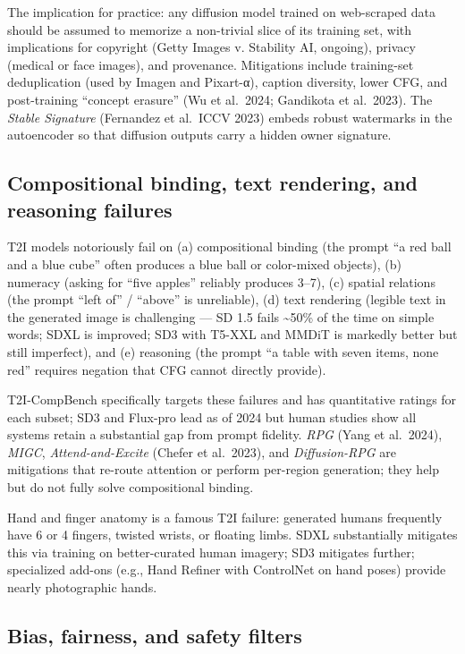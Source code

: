 The implication for practice: any diffusion model trained on web-scraped data should be assumed to memorize a non-trivial slice of its training set, with implications for copyright (Getty Images v. Stability AI, ongoing), privacy (medical or face images), and provenance. Mitigations include training-set deduplication (used by Imagen and Pixart-α), caption diversity, lower CFG, and post-training ``concept erasure'' (Wu et al.~2024; Gandikota et al.~2023). The \emph{Stable Signature} (Fernandez et al.~ICCV 2023) embeds robust watermarks in the autoencoder so that diffusion outputs carry a hidden owner signature.

\subsection{Compositional binding, text rendering, and reasoning failures}\label{compositional-binding-text-rendering-and-reasoning-failures}

T2I models notoriously fail on (a) compositional binding (the prompt ``a red ball and a blue cube'' often produces a blue ball or color-mixed objects), (b) numeracy (asking for ``five apples'' reliably produces 3--7), (c) spatial relations (the prompt ``left of'' / ``above'' is unreliable), (d) text rendering (legible text in the generated image is challenging --- SD 1.5 fails \textasciitilde50\% of the time on simple words; SDXL is improved; SD3 with T5-XXL and MMDiT is markedly better but still imperfect), and (e) reasoning (the prompt ``a table with seven items, none red'' requires negation that CFG cannot directly provide).

T2I-CompBench specifically targets these failures and has quantitative ratings for each subset; SD3 and Flux-pro lead as of 2024 but human studies show all systems retain a substantial gap from prompt fidelity. \emph{RPG} (Yang et al.~2024), \emph{MIGC}, \emph{Attend-and-Excite} (Chefer et al.~2023), and \emph{Diffusion-RPG} are mitigations that re-route attention or perform per-region generation; they help but do not fully solve compositional binding.

Hand and finger anatomy is a famous T2I failure: generated humans frequently have 6 or 4 fingers, twisted wrists, or floating limbs. SDXL substantially mitigates this via training on better-curated human imagery; SD3 mitigates further; specialized add-ons (e.g., Hand Refiner with ControlNet on hand poses) provide nearly photographic hands.

\subsection{Bias, fairness, and safety filters}\label{bias-fairness-and-safety-filters}

